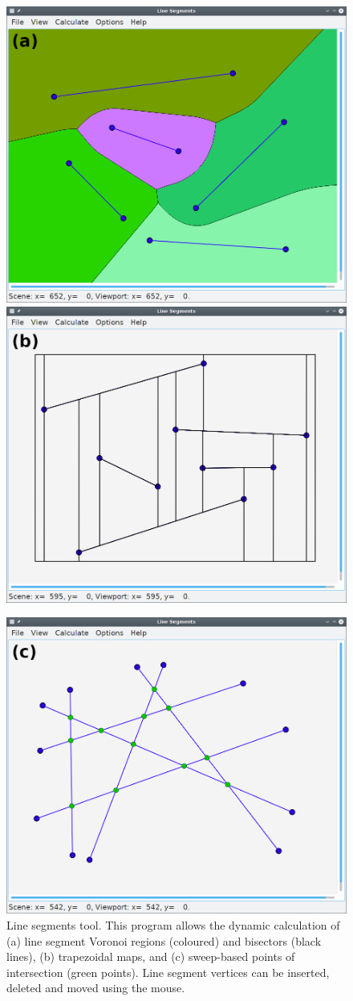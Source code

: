 \begin{figure}[h]
	\centering
	\includegraphics[width = 0.49 \textwidth]{figures/linesgui_voro}
	\hspace{0.05cm}
	\includegraphics[width = 0.49 \textwidth]{figures/linesgui_trapezoid}

	\vspace{0.25cm}
	\includegraphics[width = 0.49 \textwidth]{figures/linesgui_inters}
	\caption[Line segments tool.]{Line segments tool.
		This program allows the dynamic calculation of
		(a) line segment Voronoi regions (coloured) and bisectors (black lines),
		(b) trapezoidal maps, and
		(c) sweep-based points of intersection (green points).
		Line segment vertices can be inserted, deleted and moved using the mouse.
		\label{fig:linesgui}}
\end{figure}



